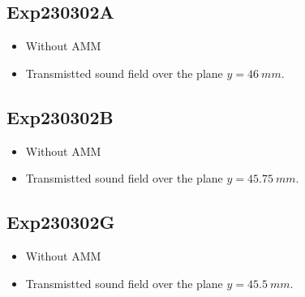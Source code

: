 \documentclass{article}
\begin{document}
\subsection{Exp230302A}
\label{sec:Exp230302A}
\begin{itemize}
    \item Without AMM
    \item Transmistted sound field over the plane $y=\SI{46}{mm}$.
\end{itemize}

\subsection{Exp230302B}
\label{sec:Exp230302B}
\begin{itemize}
    \item Without AMM
    \item Transmistted sound field over the plane $y=\SI{45.75}{mm}$.
\end{itemize}

\subsection{Exp230302G}
\label{sec:Exp230302G}
\begin{itemize}
    \item Without AMM
    \item Transmistted sound field over the plane $y=\SI{45.5}{mm}$.
\end{itemize}
\end{document}

